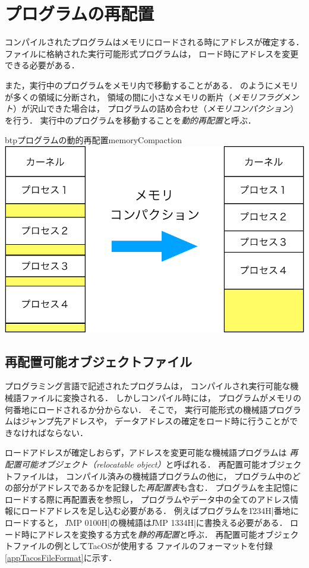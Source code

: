\section{プログラムの再配置}
コンパイルされたプログラムはメモリにロードされる時にアドレスが確定する．
ファイルに格納された実行可能形式プログラムは，
ロード時にアドレスを変更できる必要がある．

また，実行中のプログラムをメモリ内で移動することがある．
のようにメモリが多くの領域に分断され，
領域の間に小さなメモリの断片（\emph{メモリフラグメント}）が沢山できた場合は，
プログラムの詰め合わせ（\emph{メモリコンパクション}）を行う．
実行中のプログラムを移動することを\emph{動的再配置}と呼ぶ．

\begin{myfig}{btp}{プログラムの動的再配置}{memoryCompaction}
  \includegraphics[scale=0.66]{Fig/memoryCompaction-crop.pdf}
\end{myfig}

\subsection{再配置可能オブジェクトファイル}
プログラミング言語で記述されたプログラムは，
コンパイルされ実行可能な機械語ファイルに変換される．
しかしコンパイル時には，
プログラムがメモリの何番地にロードされるか分からない．
そこで，
実行可能形式の機械語プログラムはジャンプ先アドレスや，
データアドレスの確定をロード時に行うことができなければならない．

ロードアドレスが確定しおらず，アドレスを変更可能な機械語プログラムは
\emph{再配置可能オブジェクト（relocatable object）}と呼ばれる．
再配置可能オブジェクトファイルは，
コンパイル済みの機械語プログラムの他に，
プログラム中のどの部分がアドレスであるかを記録した\emph{再配置表}も含む．
プログラムを主記憶にロードする際に再配置表を参照し，
プログラムやデータ中の全てのアドレス情報にロードアドレスを足し込む必要がある．
例えばプログラムを\|1234H|番地にロードすると，
\|JMP 0100H|の機械語は\|JMP 1334H|に書換える必要がある．
ロード時にアドレスを変換する方式を\emph{静的再配置}と呼ぶ．
再配置可能オブジェクトファイルの例としてTacOSが使用する
ファイルのフォーマットを付録\ref{appTacosFileFormat}に示す．

